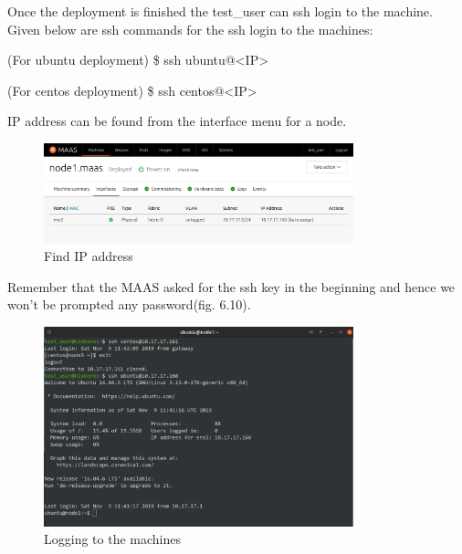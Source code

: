 Once the deployment is finished the test\_user can ssh login to the machine. Given below are ssh commands for the ssh login to the machines:

(For ubuntu deployment) \$ ssh ubuntu@\textless IP\textgreater

(For centos deployment) \$ ssh centos@\textless IP\textgreater

IP address can be found from the interface menu for a node.

\begin{figure}[!ht]
    \centering
    \includegraphics[width=0.8\textwidth]{images/6-9.png}
    \caption{Find IP address}
\end{figure}

Remember that the MAAS asked for the ssh key in the beginning and hence we won't be prompted any password(fig. 6.10).

\begin{figure}[!ht]
    \centering
    \includegraphics[width=0.8\textwidth]{images/6-10.png}
    \caption{Logging to the machines}
\end{figure}

